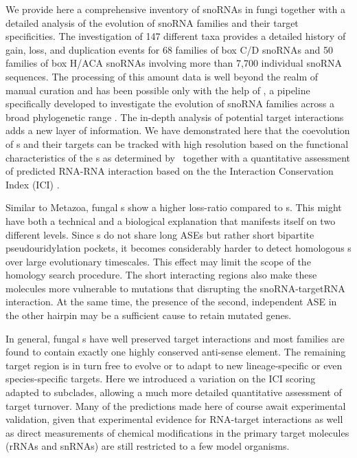 
We provide here a comprehensive inventory of snoRNAs in fungi together
with a detailed analysis of the evolution of snoRNA families and their
target specificities. The investigation of 147 different taxa provides
a detailed history of gain, loss, and duplication events for 68
families of box C/D snoRNAs and 50 families of box H/ACA snoRNAs
involving more than 7,700 individual snoRNA sequences. The processing
of this amount data is well beyond the realm of manual curation and
has been possible only with the help of \snostrip, a pipeline
specifically developed to investigate the evolution of snoRNA families
across a broad phylogenetic range \cite{Bartschat:2014}.  The in-depth
analysis of potential target interactions adds a new layer of
information. We have demonstrated here that the coevolution of \sno s
and their targets can be tracked with high resolution based on the
functional characteristics of the \sno s as determined by \snostrip\
together with a quantitative assessment of predicted RNA-RNA
interaction based on the the Interaction Conservation Index (ICI)
\cite{Kehr:2014}.

Similar to Metazoa, fungal \haca s show a higher loss-ratio compared
to \cd s. This might have both a technical and a biological
explanation that manifests itself on two different levels. Since \haca
s do not share long ASEs but rather short bipartite pseudouridylation
pockets, it becomes considerably harder to detect homologous \sno s
over large evolutionary timescales. This effect may limit the
scope of the homology search procedure. The short interacting regions
also make these molecules more vulnerable to mutations that disrupting
the snoRNA-targetRNA interaction. At the same time, the presence of
the second, independent ASE in the other hairpin may be a sufficient
cause to retain mutated genes.

In general, fungal \sno s have well preserved target interactions and
most families are found to contain exactly one highly conserved
anti-sense element. The remaining target region is in turn free to
evolve or to adapt to new lineage-specific or even species-specific
targets. Here we introduced a variation on the ICI scoring adapted to
subclades, allowing a much more detailed quantitative assessment of
target turnover. Many of the predictions made here of course await
experimental validation, given that experimental evidence for
RNA-target interactions as well as direct measurements of chemical
modifications in the primary target molecules (rRNAs and snRNAs) are
still restricted to a few model organisms.

